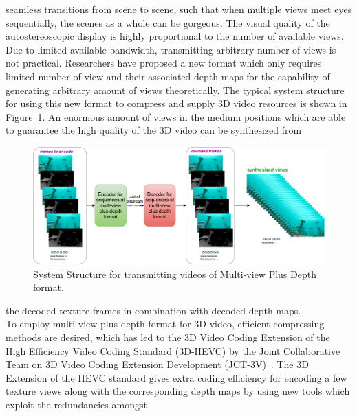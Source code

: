 seamless transitions from scene to scene, such that when multiple views
meet eyes sequentially, the scenes as a whole can be gorgeous.
The visual quality of the autostereoscopic display is highly proportional to
the number of available views.
Due to limited available bandwidth, transmitting arbitrary number of views
is not practical.
Researchers have proposed a new format which only requires limited number
of view and their associated depth maps for the capability of
generating arbitrary amount of views theoretically.
The typical system structure for using this new format to compress and supply 3D video
resources is shown in Figure~\ref{fig:SS-MVD}.
An enormous amount of views in the medium positions which are able to
guarantee the high quality of the 3D video can be synthesized from
\begin{figure}[!b]
    \centering
    \includegraphics[width=\textwidth,height=\textheight,keepaspectratio]{Figures/SystemStructureOf3DEncoder}
    \caption[System Structure for transmitting videos of Multi-view Plus Depth format]{System Structure for transmitting videos of Multi-view Plus Depth format.}
    \label{fig:SS-MVD}
\end{figure}
the decoded texture frames in combination with decoded depth maps.\\
\newline
To employ multi-view plus depth format for 3D video, efficient compressing
methods are desired, which has led to the 3D Video Coding Extension of the
High Efficiency Video Coding Standard (3D-HEVC) by the Joint Collaborative Team
on 3D Video Coding Extension Development (JCT-3V)~\parencite{RN195}.
The 3D Extension of the HEVC standard gives extra coding efficiency
for encoding a few texture views along with the corresponding depth maps by
using new tools which exploit the redundancies amongst
